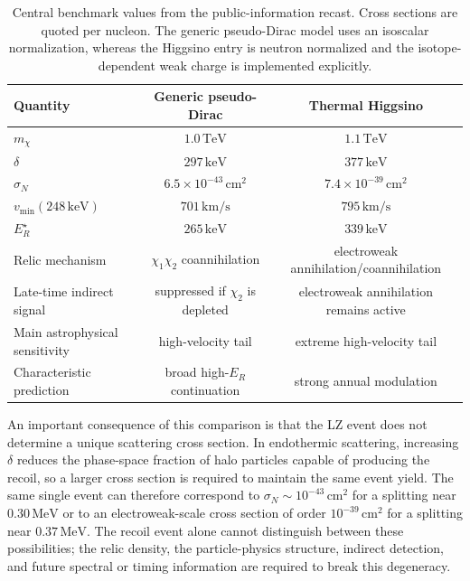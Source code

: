 \documentclass[aps,prd,reprint,superscriptaddress,nofootinbib,longbibliography,floatfix]{revtex4-2}
\newcommand{\TeV}{\mathrm{TeV}}
\newcommand{\keV}{\mathrm{keV}}
\begin{document}
\begin{table}[t]
\caption{Central benchmark values from the public-information recast. Cross sections are quoted per nucleon. The generic pseudo-Dirac model uses an isoscalar normalization, whereas the Higgsino entry is neutron normalized and the isotope-dependent weak charge is implemented explicitly.}
\label{tab:benchmarks}
\begin{ruledtabular}
\begin{tabular}{lcc}
Quantity & Generic pseudo-Dirac & Thermal Higgsino\\
\hline
$m_\chi$ & $1.0\,\TeV$ & $1.1\,\TeV$\\
$\delta$ & $297\,\keV$ & $377\,\keV$\\
$\sigma_N$ & $6.5\times10^{-43}\,\mathrm{cm}^2$ & $7.4\times10^{-39}\,\mathrm{cm}^2$\\
$v_{\min}(248\,\keV)$ & $701\,\mathrm{km/s}$ & $795\,\mathrm{km/s}$\\
$E_R^\star$ & $265\,\keV$ & $339\,\keV$\\
Relic mechanism & $\chi_1\chi_2$ coannihilation & electroweak annihilation/coannihilation\\
Late-time indirect signal & suppressed if $\chi_2$ is depleted & electroweak annihilation remains active\\
Main astrophysical sensitivity & high-velocity tail & extreme high-velocity tail\\
Characteristic prediction & broad high-$E_R$ continuation & strong annual modulation\\
\end{tabular}
\end{ruledtabular}
\end{table}

An important consequence of this comparison is that the LZ event does not determine a unique scattering cross section. In endothermic scattering, increasing $\delta$ reduces the phase-space fraction of halo particles capable of producing the recoil, so a larger cross section is required to maintain the same event yield. The same single event can therefore correspond to $\sigma_N\sim10^{-43}\,\mathrm{cm}^2$ for a splitting near $0.30\,\mathrm{MeV}$ or to an electroweak-scale cross section of order $10^{-39}\,\mathrm{cm}^2$ for a splitting near $0.37\,\mathrm{MeV}$. The recoil event alone cannot distinguish between these possibilities; the relic density, the particle-physics structure, indirect detection, and future spectral or timing information are required to break this degeneracy.
\end{document}
